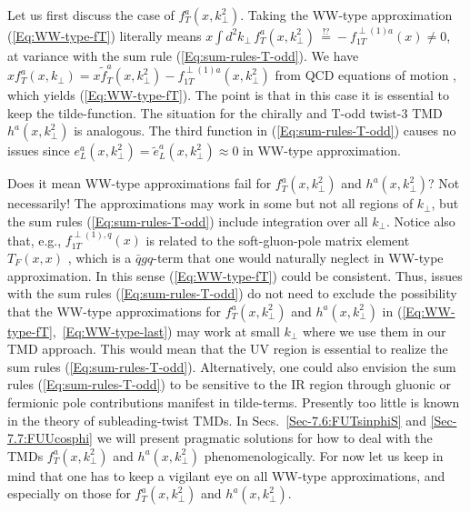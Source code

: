 \documentclass[a4paper,11pt]{article}
\def\kperp{k_\perp}
\begin{document}
Let us first discuss the case of $f_T^a(x,k_\perp^{2})$. Taking the
WW-type approximation (\ref{Eq:WW-type-fT}) literally means
$x\int d^2 k_\perp\,f_T^a(x,k_\perp^{2})\,\stackrel{!?}{=}
-f_{1T}^{\perp(1)a}(x)\neq0$,
at variance with the sum rule (\ref{Eq:sum-rules-T-odd}). We
have $xf_T^a(x,k_\perp)=x\tilde{f}_T^a(x,k_\perp^{2})-f_{1T}^{\perp(1)a}(x,k_\perp^{2})$
from QCD equations of motion \cite{Bacchetta:2006tn}, which yields
(\ref{Eq:WW-type-fT}). The point is that in this case it is
essential to keep the tilde-function.
The situation for the chirally and T-odd twist-3
TMD $h^a(x,k_\perp^{2})$ is analogous. The third
function in (\ref{Eq:sum-rules-T-odd}) causes no issues since
$e_L^a(x,k_\perp^{2})=\tilde{e}_L^a(x,k_\perp^{2})\approx0$ in WW-type approximation.

Does it mean WW-type approximations fail for $f_T^a(x,k_\perp^{2})$
and $h^a(x,k_\perp^{2})$? Not necessarily! The approximations may
work in some but not all regions of $\kperp$, but the sum rules
(\ref{Eq:sum-rules-T-odd}) include integration over all $k_\perp$.
Notice also that, e.g., $f_{1T}^{\perp (1),q}(x)$ is related to the
soft-gluon-pole matrix element $T_{F}(x,x)$ \cite{Boer:2003cm,Ji:2006ub},
which is a $\bar{q}gq$-term that one would naturally neglect
in WW-type approximation.
In this sense (\ref{Eq:WW-type-fT}) could be consistent.
Thus, issues with the sum rules
(\ref{Eq:sum-rules-T-odd}) do not need to exclude the
possibility that the WW-type approximations for $f_T^a(x,k_\perp^{2})$ and
$h^a(x,k_\perp^{2})$ in (\ref{Eq:WW-type-fT},~\ref{Eq:WW-type-last})
may work at small $k_\perp$ where we use them in our TMD approach.
This would mean that the UV region is essential to realize the sum rules
(\ref{Eq:sum-rules-T-odd}). Alternatively, one could also envision
the sum rules (\ref{Eq:sum-rules-T-odd}) to be sensitive to the
IR region through gluonic or fermionic pole contributions manifest
in tilde-terms.
Presently too little is known in the theory of subleading-twist TMDs.
In Secs.~\ref{Sec-7.6:FUTsinphiS} and \ref{Sec-7.7:FUUcosphi} we
will present pragmatic solutions for how to deal with the TMDs
$f_T^a(x,k_\perp^{2})$ and $h^a(x,k_\perp^2)$ phenomenologically.
For now let us keep in mind that
one has to keep a vigilant eye on all WW-type approximations, and
especially on those for $f_T^a(x,k_\perp^{2})$ and $h^a(x,k_\perp^{2})$.
\end{document}
